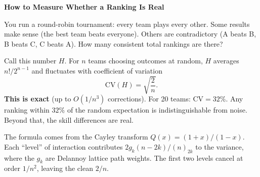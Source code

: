 \documentclass[12pt]{article}
\begin{document}
\begin{center}
{\Large\bfseries How to Measure Whether a Ranking Is Real}
\end{center}

\medskip

You run a round-robin tournament: every team plays every other. Some results make sense (the best team beats everyone). Others are contradictory (A beats B, B beats C, C beats A). How many consistent total rankings are there?

Call this number $H$. For $n$ teams choosing outcomes at random, $H$ averages $n!/2^{n-1}$ and fluctuates with coefficient of variation
\[
\mathrm{CV}(H) = \sqrt{\frac{2}{n}}.
\]
\textbf{This is exact} (up to $O(1/n^3)$ corrections). For 20 teams: $\mathrm{CV} = 32\%$. Any ranking within $32\%$ of the random expectation is indistinguishable from noise. Beyond that, the skill differences are real.

The formula comes from the Cayley transform $Q(x) = (1{+}x)/(1{-}x)$. Each ``level'' of interaction contributes $2g_k(n{-}2k)/(n)_{2k}$ to the variance, where the $g_k$ are Delannoy lattice path weights. The first two levels cancel at order $1/n^2$, leaving the clean $2/n$.
\end{document}

